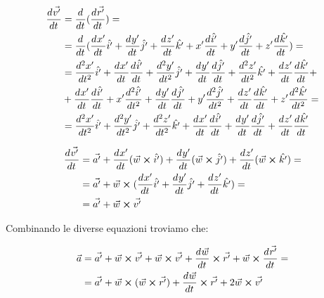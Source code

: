 \begin{equation}
  \begin{split}
    \der{\vec{v'}}{t} &= \der{}{t} (\der{\vec{r'}}{t}) = \\
    &= \der{}{t} (\der{x'}{t}\uvec{i'} + \der{y'}{t}\uvec{j'} + \der{z'}{t}\uvec{k'} +
    x' \der{\uvec{i'}}{t} + y' \der{\uvec{j'}}{t} + z' \der{\uvec{k'}}{t}) = \\
    &=
    \der[2]{x'}{t} \uvec{i'} + \der{x'}{t} \der{\uvec{i'}}{t} +
    \der[2]{y'}{t} \uvec{j'} + \der{y'}{t} \der{\uvec{j'}}{t} +
    \der[2]{z'}{t} \uvec{k'} + \der{z'}{t} \der{\uvec{k'}}{t} + \\
    &+ \der{x'}{t} \der{\uvec{i'}}{t} + x' \der[2]{\uvec{i'}}{t} +
    \der{y'}{t} \der{\uvec{j'}}{t} + y' \der[2]{\uvec{j'}}{t} +
    \der{z'}{t} \der{\uvec{k'}}{t} + z' \der[2]{\uvec{k'}}{t} = \\
    &= \der[2]{x'}{t} \uvec{i'} + \der[2]{y'}{t} \uvec{j'} + \der[2]{z'}{t} \uvec{k'} +
    \der{x'}{t} \der{\uvec{i'}}{t} + \der{y'}{t} \der{\uvec{j'}}{t} + \der{z'}{t} \der{\uvec{k'}}{t}
  \end{split}
\end{equation}

\begin{equation}
  \begin{split}
    \der{\vec{v'}}{t} &= \vec{a'} +
    \der{x'}{t} (\vec{w} \crossproduct \uvec{i'}) +
    \der{y'}{t} (\vec{w} \crossproduct \uvec{j'}) +
    \der{z'}{t} (\vec{w} \crossproduct \uvec{k'}) = \\
    &= \vec{a'} + \vec{w} \crossproduct (
    \der{x'}{t}\uvec{i'} + \der{y'}{t}\uvec{j'} + \der{z'}{t}\uvec{k'}
    ) = \\
    &= \vec{a'} + \vec{w} \crossproduct \vec{v'}
  \end{split}
\end{equation}

Combinando le diverse equazioni troviamo che:

\begin{equation}
  \begin{split} \label{eq:moti_relativi_acceleration}
    \vec{a} &= \vec{a'} +
    \vec{w} \crossproduct \vec{v'} +
    \vec{w} \crossproduct \vec{v'} +
    \der{\vec{w}}{t} \crossproduct \vec{r'} +
    \vec{w} \crossproduct \der{\vec{r'}}{t} = \\
    &= \vec{a'} +
    \vec{w} \crossproduct (\vec{w} \crossproduct \vec{r'}) + \der{\vec{w}}{t} \crossproduct \vec{r'} +
    2 \vec{w} \crossproduct \vec{v'}
  \end{split}
\end{equation}

